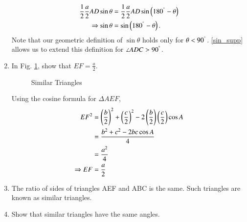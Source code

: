 \begin{enumerate}[label=\arabic*.,ref=\thesubsection.\theenumi]
\begin{align}
\frac{1}{2}\frac{a}{2}AD \sin \theta &= \frac{1}{2}\frac{a}{2}AD \sin \left(180^{\degree}-\theta\right) \\
\Rightarrow \sin \theta &= \sin \left(180^{\degree} - \theta\right).
\label{sin_supp}
\end{align}
Note that our geometric definition of $\sin \theta$ holds only for $\theta < 90^{\degree}$.  \eqref{sin_supp} allows us to extend this definition for $\angle ADC > 90^{\degree}$.



%
%
\item
	In Fig. \ref{ch2_sim_triang}, show that $EF = \frac{a}{2}$.  

%
\begin{figure}[!ht]
	\begin{center}
		
		\resizebox{\columnwidth}{!}{}
	\end{center}
	\caption{Similar Triangles}
	\label{ch2_sim_triang}	
\end{figure}

\solution Using the cosine formula for $\Delta AEF$,
%
\begin{align}
EF^2 &= \left(\frac{b}{2}\right)^2 + \left(\frac{c}{2}\right)^2 - 2 \left(\frac{b}{2}\right)\left(\frac{c}{2}\right) \cos A \\
&= \frac{b^2 + c^2 - 2bc \cos A}{4} \\
&= \frac{a^2}{4} \\
\Rightarrow EF &= \frac{a}{2}
\end{align}
%

\item
	The ratio of sides of triangles AEF and ABC is the same.  Such triangles are known as similar triangles.

\item
	Show that similar triangles have the same angles.


\end{enumerate}
